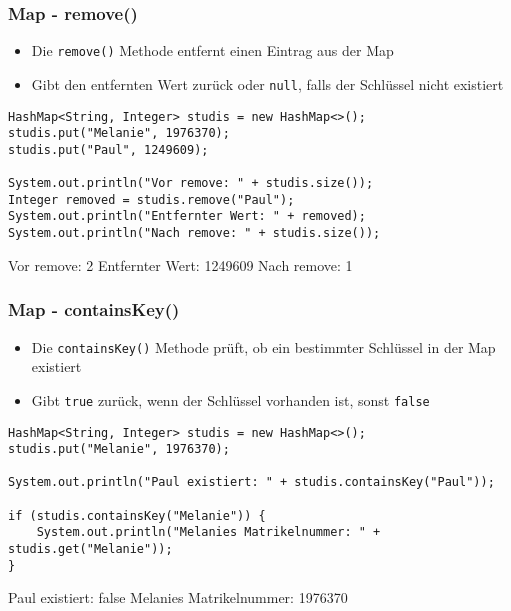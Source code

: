 \documentclass{../../presentation}
\begin{document}
\begin{frame}[fragile]
	\frametitle{Map - remove()}
	\begin{itemize}
		\item Die \texttt{remove()} Methode entfernt einen Eintrag aus der Map
		\item Gibt den entfernten Wert zurück oder \texttt{null}, falls der Schlüssel nicht existiert
	\end{itemize}
	\begin{verbatim}
HashMap<String, Integer> studis = new HashMap<>();
studis.put("Melanie", 1976370);
studis.put("Paul", 1249609);

System.out.println("Vor remove: " + studis.size());
Integer removed = studis.remove("Paul");
System.out.println("Entfernter Wert: " + removed);
System.out.println("Nach remove: " + studis.size());
	\end{verbatim}
	\begin{ausgabe}
		Vor remove: 2 \newline
		Entfernter Wert: 1249609 \newline
		Nach remove: 1
	\end{ausgabe}
\end{frame}

\begin{frame}[fragile]
	\frametitle{Map - containsKey()}
	\begin{itemize}
		\item Die \texttt{containsKey()} Methode prüft, ob ein bestimmter Schlüssel in der Map existiert
		\item Gibt \texttt{true} zurück, wenn der Schlüssel vorhanden ist, sonst \texttt{false}
	\end{itemize}
	\begin{verbatim}
HashMap<String, Integer> studis = new HashMap<>();
studis.put("Melanie", 1976370);

System.out.println("Paul existiert: " + studis.containsKey("Paul"));

if (studis.containsKey("Melanie")) {
    System.out.println("Melanies Matrikelnummer: " + studis.get("Melanie"));
}
	\end{verbatim}
	\begin{ausgabe}
		Paul existiert: false \newline
		Melanies Matrikelnummer: 1976370
	\end{ausgabe}
\end{frame}
\end{document}
